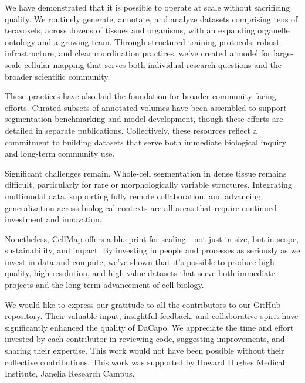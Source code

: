 \documentclass[times, twoside]{zHenriquesLab-StyleBioRxiv}
\begin{document}
We have demonstrated that it is possible to operate at scale without sacrificing quality. We routinely generate, annotate, and analyze datasets comprising tens of teravoxels, across dozens of tissues and organisms, with an expanding organelle ontology and a growing team. Through structured training protocols, robust infrastructure, and clear coordination practices, we’ve created a model for large-scale cellular mapping that serves both individual research questions and the broader scientific community.

These practices have also laid the foundation for broader community-facing efforts. Curated subsets of annotated volumes have been assembled to support segmentation benchmarking and model development, though these efforts are detailed in separate publications. Collectively, these resources reflect a commitment to building datasets that serve both immediate biological inquiry and long-term community use.

Significant challenges remain. Whole-cell segmentation in dense tissue remains difficult, particularly for rare or morphologically variable structures. Integrating multimodal data, supporting fully remote collaboration, and advancing generalization across biological contexts are all areas that require continued investment and innovation.

Nonetheless, CellMap offers a blueprint for scaling—not just in size, but in scope, sustainability, and impact. By investing in people and processes as seriously as we invest in data and compute, we’ve shown that it’s possible to produce high-quality, high-resolution, and high-value datasets that serve both immediate projects and the long-term advancement of cell biology.

\begin{acknowledgements}
We would like to express our gratitude to all the contributors to our GitHub repository. Their valuable input, insightful feedback, and collaborative spirit have significantly enhanced the quality of DaCapo. We appreciate the time and effort invested by each contributor in reviewing code, suggesting improvements, and sharing their expertise. This work would not have been possible without their collective contributions. This work was supported by Howard Hughes Medical Institute, Janelia Research Campus.
\end{acknowledgements}
\end{document}
